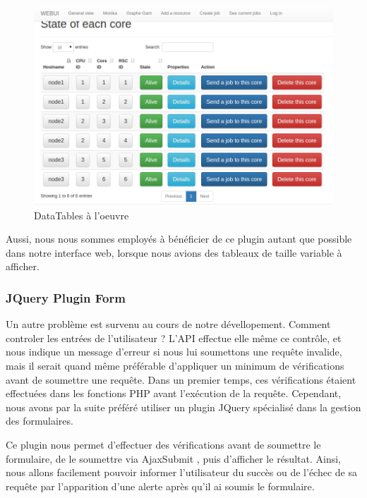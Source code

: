 \documentclass[a4paper,10pt]{article}
\begin{document}
\begin{figure}[h]
  \begin{center}
    \includegraphics[scale=0.38]{./all.png}
   \caption{\label{all} DataTables à l'oeuvre}
  \end{center}
\end{figure}

Aussi, nous nous sommes employés à bénéficier de ce plugin autant que possible dans notre interface web, lorsque nous avions des tableaux de taille variable à afficher.
\subsubsection{JQuery Plugin Form}
Un autre problème est survenu au cours de notre dévellopement. Comment controler les entrées de l'utilisateur ? L'API effectue elle même ce contrôle, et nous indique un message d'erreur si nous lui soumettons
une requête invalide, mais il serait quand même préférable d'appliquer un minimum de vérifications avant de soumettre une requête. Dans un premier temps, ces vérifications étaient effectuées dans les fonctions PHP
avant l'exécution de la requête. Cependant, nous avons par la suite préféré utiliser un plugin JQuery spécialisé dans la gestion des formulaires.

Ce plugin nous permet d'effectuer des vérifications avant de soumettre le formulaire, de le soumettre via AjaxSubmit , puis d'afficher le résultat. Ainsi, nous allons facilement pouvoir informer l'utilisateur du succès ou de l'échec de
sa requête par l'apparition d'une alerte après qu'il ai soumis le formulaire.
\end{document}
